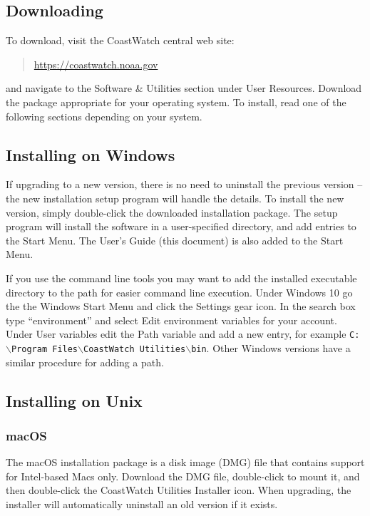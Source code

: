 \subsection{Downloading}

To download, visit the CoastWatch central web site: 
\begin{quote}
  \url{https://coastwatch.noaa.gov}
\end{quote}
and navigate to the {\gui Software \& Utilities} section under
{\gui User Resources}.  Download the package appropriate for your
operating system. To install, read one of the following sections
depending on your system.

\subsection{Installing on Windows}

If upgrading to a new version, there is no need to uninstall the
previous version -- the new installation setup program will handle
the details.  To install the new version, simply double-click the
downloaded installation package. The setup program will install the
software in a user-specified directory, and add entries to the Start
Menu.  The User's Guide (this document) is also added to the Start
Menu.

If you use the command line tools you may want to add the installed
executable directory to the path for easier command line execution.  Under
Windows 10 go the the Windows {\gui Start Menu} and click the
{\gui Settings} gear icon.  In the search box type ``environment'' and select
{\gui Edit environment variables for your account}.  Under {\gui User variables}
edit the {\gui Path} variable and add a new entry, for example
{\tt C:$\backslash$Program Files$\backslash$CoastWatch Utilities$\backslash$bin}.
Other Windows versions have a similar procedure for adding a path.

\subsection{Installing on Unix}

\subsubsection{macOS}

The macOS installation package is a disk image (DMG) file that
contains support for Intel-based Macs only.  Download the DMG file,
double-click to mount it, and then
double-click the {\gui CoastWatch Utilities Installer} icon.
When upgrading, the installer will automatically uninstall an old version if
it exists.


